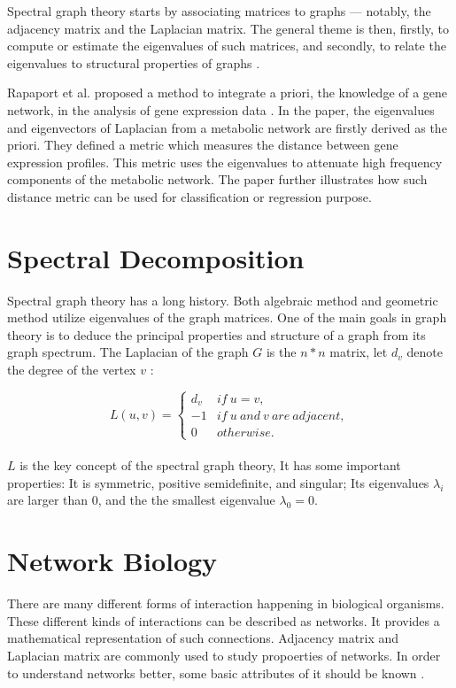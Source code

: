\documentclass{article} %
\begin{document}
Spectral graph theory starts by associating matrices to graphs — notably, the adjacency matrix and the Laplacian matrix. The general theme is then, ﬁrstly, to compute or estimate the eigenvalues of such matrices, and secondly, to relate the eigenvalues to structural properties of graphs \cite{nica_brief_2018}.

Rapaport et al. proposed a method to integrate a priori, the knowledge of a gene network, in the analysis of gene expression data \cite{rapaport_classification_2007}. In the paper, the eigenvalues and eigenvectors of Laplacian from a metabolic network are firstly derived as the priori. They defined a metric which measures the distance between gene expression profiles. This metric uses the eigenvalues to attenuate high frequency components of the metabolic network. The paper further illustrates how such distance metric can be used for classification or regression purpose. 

\section{Spectral Decomposition} \label{section:background-start}
Spectral graph theory has a long history. Both algebraic method and geometric method utilize eigenvalues of  the graph matrices. One of the main goals in graph theory is to deduce the principal properties and structure of a graph from its graph spectrum. The Laplacian of the graph $G$ is the $n * n$ matrix, let $d_v$ denote the degree of the vertex $v$ \cite{chung_spectral_1997}:

\[
    L (u, v) = 
    \begin{cases}
        d_v & if\ u = v,\\
        -1 & if\ u\ and\ v\ are\ adjacent,\\
        0 & otherwise.
    \end{cases}
    \]\\

$L$ is the key concept of the spectral graph theory, It has some important properties: It is symmetric, positive semidefinite, and singular; Its eigenvalues $\lambda_{i}$ are larger than $0$, and the  the smallest eigenvalue $\lambda_0 = 0$. 

\section{Network Biology}
There are many different forms of interaction happening in biological organisms. These different kinds of interactions can be described as networks. It provides a mathematical representation of such connections. Adjacency matrix and Laplacian matrix are commonly used to study propoerties of networks. In order to understand networks better, some basic attributes of it should be known \cite{barabasi_network_2004}.
\end{document}
